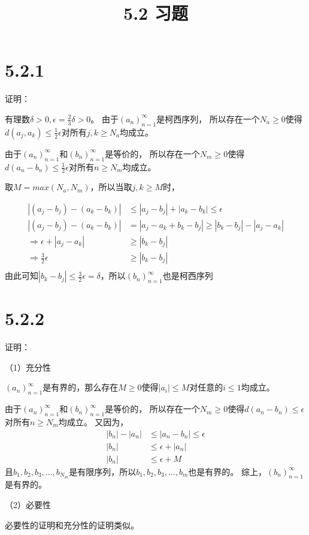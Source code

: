 \documentclass{article}
\theoremstyle{mystyle}
\begin{document}
\title{5.2 习题}
\maketitle

\section*{5.2.1}

证明：

有理数$\delta >0, \epsilon=\frac{2}{3}\delta > 0$。
由于$(a_n)_{n=1}^\infty$是柯西序列，
所以存在一个$N_a \geq 0$使得$d(a_j,a_k) \leq \frac{1}{2} \epsilon$对所有$j,k \geq N_a$均成立。

由于$(a_n)_{n=1}^\infty$和$(b_n)_{n=1}^\infty$是等价的，
所以存在一个$N_m \geq 0$使得$d(a_n-b_n) \leq \frac{1}{2} \epsilon$对所有$n \geq N_m$均成立。

取$M=max(N_a,N_m)$，所以当取$j,k \geq M$时，

\begin{align*}
  |(a_j-b_j) - (a_k - b_k)|          & \leq |a_j-b_j| + |a_k - b_k| \leq \epsilon       \\
  |(a_j-b_j) - (a_k - b_k)|          & = |a_j-a_k + b_k-b_j| \geq |b_k-b_j| - |a_j-a_k| \\
  \Rightarrow  \epsilon +  |a_j-a_k| & \geq |b_k-b_j|                                   \\
  \Rightarrow \frac{3}{2}\epsilon    & \geq |b_k-b_j|                                   \\
\end{align*}
由此可知$|b_k-b_j| \leq \frac{3}{2}\epsilon = \delta$，所以$(b_n)_{n=1}^\infty$也是柯西序列

\section*{5.2.2}

证明：

（1）充分性

$(a_n)_{n=1}^\infty$是有界的，那么存在$M \geq 0$使得$|a_i| \leq M$对任意的$i \leq 1$均成立。

由于$(a_n)_{n=1}^\infty$和$(b_n)_{n=1}^\infty$是等价的，
所以存在一个$N_m \geq 0$使得$d(a_n-b_n) \leq \epsilon$对所有$n \geq N_m$均成立。
又因为，
\begin{align*}
  |b_n| - |a_n| & \leq |a_n - b_n| \leq \epsilon \\
  |b_n|         & \leq \epsilon + |a_n|          \\
  |b_n|         & \leq \epsilon + M
\end{align*}
且$b_1,b_2,b_3,...,b_{N_m}$是有限序列，所以$b_1,b_2,b_3,...,b_m$也是有界的。
综上，$(b_n)_{n=1}^\infty$是有界的。

（2）必要性

必要性的证明和充分性的证明类似。
\end{document}
